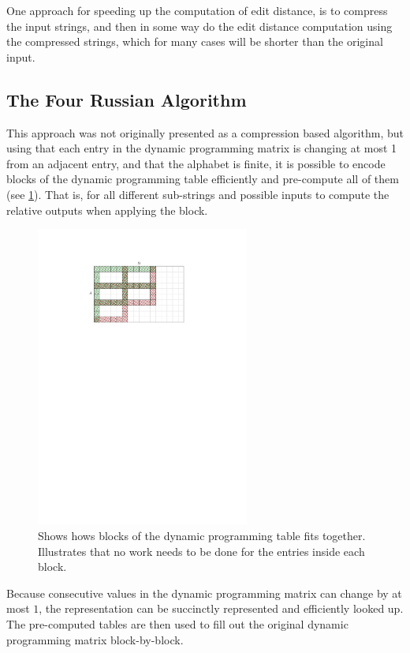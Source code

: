 \documentclass[twoside,11pt,openright]{report}
\begin{document}
One approach for speeding up the computation of edit distance, is to compress the input strings, and then in some way do the edit distance computation using the compressed strings, which for many cases will be shorter than the original input.

\subsection{The Four Russian Algorithm}
\label{sec:4-russian}
This approach was not originally presented as a compression based algorithm, but using that each entry in the dynamic programming matrix is changing at most 1 from an adjacent entry, and that the alphabet is finite, it is possible to encode blocks of the dynamic programming table efficiently and pre-compute all of them (see \cref{fig:intro:dist-tables}). That is, for all different sub-strings and possible inputs to compute the relative outputs when applying the block. 

\begin{figure}[!htb]
  \centering
  \includegraphics[width=7cm]{images/grid-dist-2}
  \caption{Shows hows blocks of the dynamic programming table fits together. Illustrates that no work needs to be done for the entries inside each block.}
  \label{fig:intro:dist-tables}
\end{figure}

Because consecutive values in the dynamic programming matrix can change by at most $1$, the representation can be succinctly represented and efficiently looked up. The pre-computed tables are then used to fill out the original dynamic programming matrix block-by-block.
\end{document}

